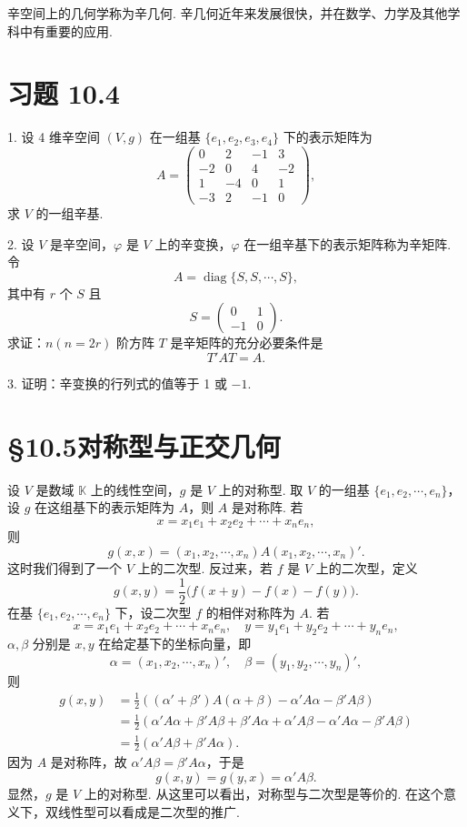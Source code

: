 \documentclass[UTF8, 12pt, fontset=fandol, oneside]{ctexart}
\begin{document}
辛空间上的几何学称为辛几何. 辛几何近年来发展很快，并在数学、力学及其他学科中有重要的应用.

\section*{习题 10.4}

1. 设 4 维辛空间 $(V,g)$ 在一组基 $\{e_1,e_2,e_3,e_4\}$ 下的表示矩阵为
\[
  A=\left(\begin{array}{rrrr}
  0&2&-1&3\\
  -2&0&4&-2\\
  1&-4&0&1\\
  -3&2&-1&0
  \end{array}\right),
\]
求 $V$ 的一组辛基.

2. 设 $V$ 是辛空间，$\varphi$ 是 $V$ 上的辛变换，$\varphi$ 在一组辛基下的表示矩阵称为辛矩阵. 令
\[
  A=\operatorname{diag}\{S,S,\cdots,S\},
\]
其中有 $r$ 个 $S$ 且
\[
  S=\left(\begin{array}{rr}
  0&1\\
  -1&0
  \end{array}\right).
\]
求证：$n(n=2r)$ 阶方阵 $T$ 是辛矩阵的充分必要条件是
\[
  T'AT=A.
\]

3. 证明：辛变换的行列式的值等于 1 或 $-1$.

\section*{§10.5\quad 对称型与正交几何}

设 $V$ 是数域 $\mathbb K$ 上的线性空间，$g$ 是 $V$ 上的对称型. 取 $V$ 的一组基 $\{e_1,e_2,\cdots,e_n\}$，设 $g$ 在这组基下的表示矩阵为 $A$，则 $A$ 是对称阵. 若
\[
  x=x_1e_1+x_2e_2+\cdots+x_ne_n,
\]
则
\[
  g(x,x)=(x_1,x_2,\cdots,x_n)A(x_1,x_2,\cdots,x_n)'.
\]
这时我们得到了一个 $V$ 上的二次型. 反过来，若 $f$ 是 $V$ 上的二次型，定义
\[
  g(x,y)=\frac12\bigl(f(x+y)-f(x)-f(y)\bigr).
\]
在基 $\{e_1,e_2,\cdots,e_n\}$ 下，设二次型 $f$ 的相伴对称阵为 $A$. 若
\[
  x=x_1e_1+x_2e_2+\cdots+x_ne_n,\quad y=y_1e_1+y_2e_2+\cdots+y_ne_n,
\]
$\alpha,\beta$ 分别是 $x,y$ 在给定基下的坐标向量，即
\[
  \alpha=(x_1,x_2,\cdots,x_n)',\quad \beta=(y_1,y_2,\cdots,y_n)',
\]
则
\[
\begin{aligned}
  g(x,y)&=\frac12\left((\alpha'+\beta')A(\alpha+\beta)-\alpha'A\alpha-\beta'A\beta\right)\\
  &=\frac12(\alpha'A\alpha+\beta'A\beta+\beta'A\alpha+\alpha'A\beta-\alpha'A\alpha-\beta'A\beta)\\
  &=\frac12(\alpha'A\beta+\beta'A\alpha).
\end{aligned}
\]
因为 $A$ 是对称阵，故 $\alpha'A\beta=\beta'A\alpha$，于是
\[
  g(x,y)=g(y,x)=\alpha'A\beta.
\]
显然，$g$ 是 $V$ 上的对称型. 从这里可以看出，对称型与二次型是等价的. 在这个意义下，双线性型可以看成是二次型的推广.
\end{document}
